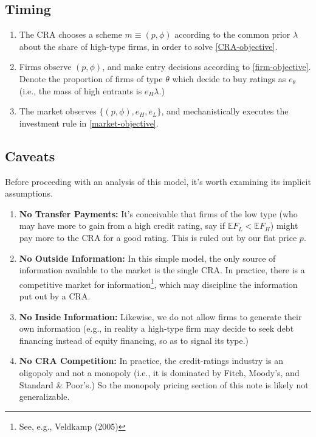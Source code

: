 \documentclass{article}
\theoremstyle{definition}
\begin{document}
\subsection{Timing}

\begin{enumerate}
    \item The CRA chooses a scheme $m \equiv (p, \phi)$ according to the common prior $\lambda$ about the share of high-type firms, in order to solve \eqref{CRA-objective}.
    
    \item Firms observe $(p, \phi)$, and make entry decisions according to \eqref{firm-objective}. Denote the proportion of firms of type $\theta$ which decide to buy ratings as $e_\theta$ (i.e., the mass of high entrants is $e_H \lambda$.)
    
    \item The market observes $\{(p, \phi), e_H, e_L\}$, and mechanistically executes the investment rule in \eqref{market-objective}.
\end{enumerate}

\subsection{Caveats}

Before proceeding with an analysis of this model, it's worth examining its implicit assumptions. 

\begin{enumerate}
    \item \textbf{No Transfer Payments:} It's conceivable that firms of the low type (who may have more to gain from a high credit rating, say if $\mathbb{E} F_L < \mathbb{E} F_H$) might pay more to the CRA for a good rating. This is ruled out by our flat price $p$.
    
    \item \textbf{No Outside Information:} In this simple model, the only source of information available to the market is the single CRA. In practice, there is a competitive market for information\footnote{See, e.g., Veldkamp (2005)}, which may discipline the information put out by a CRA.
    
    \item \textbf{No Inside Information:} Likewise, we do not allow firms to generate their own information (e.g., in reality a high-type firm may decide to seek debt financing instead of equity financing, so as to signal its type.)
    
    \item \textbf{No CRA Competition:} In practice, the credit-ratings industry is an oligopoly and not a monopoly (i.e., it is dominated by Fitch, Moody's, and Standard \& Poor's.) So the monopoly pricing section of this note is likely not generalizable.
\end{enumerate}
\end{document}
